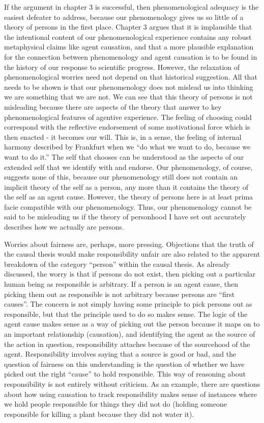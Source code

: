 \documentclass[phd,12pt,oneside,paper=letterpaper]{ubcthesis}
\begin{document}
If the argument in chapter 3 is successful, then phenomenological adequacy is the easiest defeater to address, because our phenomenology gives us so little of a theory of persons in the first place.  Chapter 3 argues that it is implausible that the intentional content of our phenomenological experience contains any robust metaphysical claims like agent causation, and that a more plausible explanation for the connection between phenomenology and agent causation is to be found in the history of our response to scientific progress. However, the relaxation of phenomenological worries need not depend on that historical suggestion. All that needs to be shown is that our phenomenology does not mislead us into thinking we are something that we are not. We can see that this theory of persons is not misleading because there are aspects of the theory that answer to key phenomenological features of agentive experience. The feeling of choosing could correspond with the reflective endorsement of some motivational force which is then enacted - it becomes our will. This is, in a sense, the feeling of internal harmony described by Frankfurt when we ``do what we want to do, because we want to do it.'' The self that chooses can be understood as the aspects of our extended self that we identify with and endorse. Our phenomenology, of course, suggests none of this, because our phenomenology still does not contain an implicit theory of the self as a person, any more than it contains the theory of the self as an agent cause. However, the theory of persons here is at least prima facie compatible with our phenomenology. Thus, our phenomenology cannot be said to be misleading us if the theory of personhood I have set out accurately describes how we actually are persons. 

Worries about fairness are, perhaps, more pressing. Objections that the truth of the causal thesis would make responsibility unfair are also related to the apparent breakdown of the category ``person'' within the causal thesis. As already discussed, the worry is that if persons do not exist, then picking out a particular human being as responsible is arbitrary. If a person is an agent cause, then picking them out as responsible is not arbitrary because persons are ``first causes''. The concern is not simply having some principle to pick persons out as responsible, but that the principle used to do so makes sense. The logic of the agent cause makes sense as a way of picking out the person because it maps on to an important relationship (causation), and identifying the agent as the source of the action in question, responsibility attaches because of the sourcehood of the agent. Responsibility involves saying that a source is good or bad, and the question of fairness on this understanding is the question of whether we have picked out the right ``cause'' to hold responsible. This way of reasoning about responsibility is not entirely without criticism. As an example, there are questions about how using causation to track responsibility makes sense of instances where we hold people responsible for things they did not do (holding someone responsible for killing a plant because they did not water it). 
\end{document}
